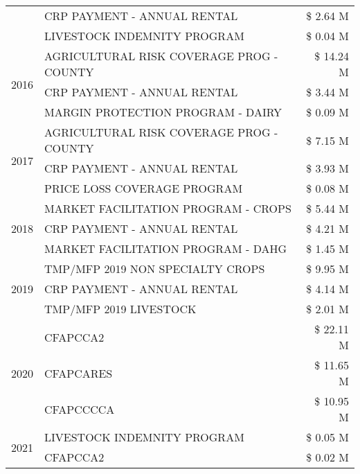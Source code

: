 \begin{tabular}{llr}
 & CRP PAYMENT - ANNUAL RENTAL & \$ 2.64 M \\
 & LIVESTOCK INDEMNITY PROGRAM & \$ 0.04 M \\
\cline{1-3}
\multirow[t]{3}{*}{2016} & AGRICULTURAL RISK COVERAGE PROG - COUNTY & \$ 14.24 M \\
 & CRP PAYMENT - ANNUAL RENTAL & \$ 3.44 M \\
 & MARGIN PROTECTION PROGRAM - DAIRY & \$ 0.09 M \\
\cline{1-3}
\multirow[t]{3}{*}{2017} & AGRICULTURAL RISK COVERAGE PROG - COUNTY & \$ 7.15 M \\
 & CRP PAYMENT - ANNUAL RENTAL & \$ 3.93 M \\
 & PRICE LOSS COVERAGE PROGRAM & \$ 0.08 M \\
\cline{1-3}
\multirow[t]{3}{*}{2018} & MARKET FACILITATION PROGRAM - CROPS & \$ 5.44 M \\
 & CRP PAYMENT - ANNUAL RENTAL & \$ 4.21 M \\
 & MARKET FACILITATION PROGRAM - DAHG & \$ 1.45 M \\
\cline{1-3}
\multirow[t]{3}{*}{2019} & TMP/MFP 2019 NON SPECIALTY CROPS & \$ 9.95 M \\
 & CRP PAYMENT - ANNUAL RENTAL & \$ 4.14 M \\
 & TMP/MFP 2019 LIVESTOCK & \$ 2.01 M \\
\cline{1-3}
\multirow[t]{3}{*}{2020} & CFAPCCA2 & \$ 22.11 M \\
 & CFAPCARES & \$ 11.65 M \\
 & CFAPCCCCA & \$ 10.95 M \\
\cline{1-3}
\multirow[t]{2}{*}{2021} & LIVESTOCK INDEMNITY PROGRAM & \$ 0.05 M \\
 & CFAPCCA2 & \$ 0.02 M \\
\cline{1-3}
\bottomrule
\end{tabular}
